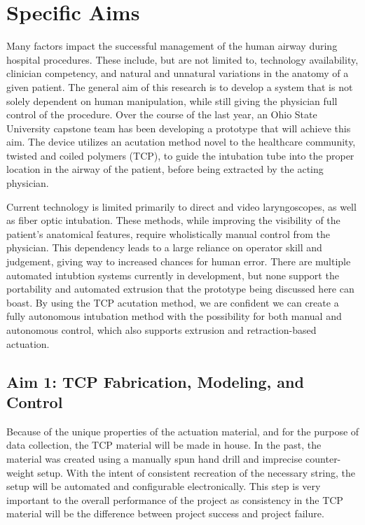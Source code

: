 \section{Specific Aims}
\label{parts:specific_aims}

Many factors impact the successful management of the human airway during hospital procedures. These include, but are not limited to, technology availability, clinician competency, and natural and unnatural variations in the anatomy of a given patient. The general aim of this research is to develop a system that is not solely dependent on human manipulation, while still giving the physician full control of the procedure. Over the course of the last year, an Ohio State University capstone team has been developing a prototype that will achieve this aim. The device utilizes an acutation method novel to the healthcare community, twisted and coiled polymers (TCP), to guide the intubation tube into the proper location in the airway of the patient, before being extracted by the acting physician.

Current technology is limited primarily to direct and video laryngoscopes, as well as fiber optic intubation. These methods, while improving the visibility of the patient's anatomical features, require wholistically manual control from the physician. This dependency leads to a large reliance on operator skill and judgement, giving way to increased chances for human error. There are multiple automated intubtion systems currently in development, but none support the portability and automated extrusion that the prototype being discussed here can boast. By using the TCP acutation method, we are confident we can create a fully autonomous intubation method with the possibility for both manual and autonomous control, which also supports extrusion and retraction-based actuation.

	\subsection{Aim 1: TCP Fabrication, Modeling, and Control}
	
	Because of the unique properties of the actuation material, and for the purpose of data collection, the TCP material will be made in house. In the past, the material was created using a manually spun hand drill and imprecise counter-weight setup. With the intent of consistent recreation of the necessary string, the setup will be automated and configurable electronically. This step is very important to the overall performance of the project as consistency in the TCP material will be the difference between project success and project failure.
	
